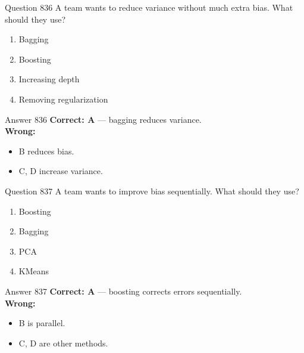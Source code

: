 \documentclass[aspectratio=169,11pt]{beamer}
\begin{document}
	\begin{frame}{Question 836}
		A team wants to reduce variance without much extra bias. What should they use?
		\begin{enumerate}[label=\Alph*.]
			\item Bagging
			\item Boosting
			\item Increasing depth
			\item Removing regularization
		\end{enumerate}
	\end{frame}
	\begin{frame}{Answer 836}
		\textbf{Correct: A} --- bagging reduces variance.\\
		\vspace{0.5em}
		\textbf{Wrong:}
		\begin{itemize}
			\item B reduces bias.
			\item C, D increase variance.
		\end{itemize}
	\end{frame}
	
	\begin{frame}{Question 837}
		A team wants to improve bias sequentially. What should they use?
		\begin{enumerate}[label=\Alph*.]
			\item Boosting
			\item Bagging
			\item PCA
			\item KMeans
		\end{enumerate}
	\end{frame}
	\begin{frame}{Answer 837}
		\textbf{Correct: A} --- boosting corrects errors sequentially.\\
		\vspace{0.5em}
		\textbf{Wrong:}
		\begin{itemize}
			\item B is parallel.
			\item C, D are other methods.
		\end{itemize}
	\end{frame}
	
\end{document}
